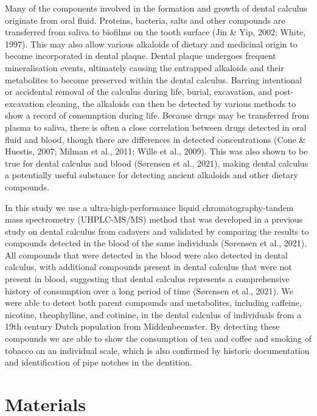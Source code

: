 \documentclass[
]{article}
\begin{document}
Many of the components involved in the formation and growth of dental
calculus originate from oral fluid. Proteins, bacteria, salts and other
compounds are transferred from saliva to biofilms on the tooth surface
(Jin \& Yip, 2002; White, 1997). This may also allow various alkaloids
of dietary and medicinal origin to become incorporated in dental plaque.
Dental plaque undergoes frequent mineralisation events, ultimately
causing the entrapped alkaloids and their metabolites to become
preserved within the dental calculus. Barring intentional or accidental
removal of the calculus during life, burial, excavation, and
post-excavation cleaning, the alkaloids can then be detected by various
methods to show a record of consumption during life. Because drugs may
be transferred from plasma to saliva, there is often a close correlation
between drugs detected in oral fluid and blood, though there are
differences in detected concentrations (Cone \& Huestis, 2007; Milman et
al., 2011; Wille et al., 2009). This was also shown to be true for
dental calculus and blood (Sørensen et al., 2021), making dental
calculus a potentially useful substance for detecting ancient alkaloids
and other dietary compounds.

In this study we use a ultra-high-performance liquid
chromatography-tandem mass spectrometry (UHPLC-MS/MS) method that was
developed in a previous study on dental calculus from cadavers and
validated by comparing the results to compounds detected in the blood of
the same individuals (Sørensen et al., 2021). All compounds that were
detected in the blood were also detected in dental calculus, with
additional compounds present in dental calculus that were not present in
blood, suggesting that dental calculus represents a comprehensive
history of consumption over a long period of time (Sørensen et al.,
2021). We were able to detect both parent compounds and metabolites,
including caffeine, nicotine, theophylline, and cotinine, in the dental
calculus of individuals from a 19th century Dutch population from
Middenbeemster. By detecting these compounds we are able to show the
consumption of tea and coffee and smoking of tobacco on an individual
scale, which is also confirmed by historic documentation and
identification of pipe notches in the dentition.

\hypertarget{materials}{%
\section{Materials}\label{materials}}
\end{document}
